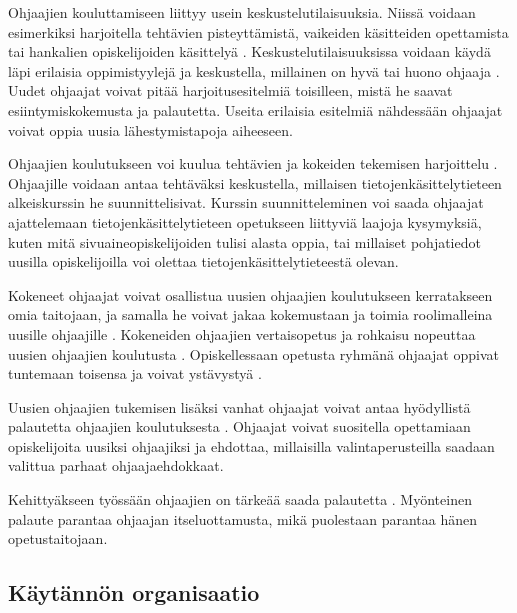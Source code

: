\documentclass[finnish]{tktltiki2}
\theoremstyle{definition}
\theoremstyle{remark}
\begin{document}
Ohjaajien kouluttamiseen liittyy usein keskustelutilaisuuksia. Niissä voidaan esimerkiksi harjoitella tehtävien pisteyttämistä, vaikeiden käsitteiden opettamista tai hankalien opiskelijoiden käsittelyä \cite{Reges03}. Kes\-kus\-te\-lu\-ti\-lai\-suuk\-sis\-sa voidaan käydä läpi erilaisia oppimistyylejä ja keskustella, millainen on hyvä tai huono ohjaaja \cite{Kay95}. Uudet ohjaajat voivat pitää harjoitusesitelmiä toisilleen, mistä he saavat esiintymiskokemusta ja palautetta. Useita erilaisia esitelmiä nähdessään ohjaajat voivat oppia uusia lähestymistapoja aiheeseen.  \par

Ohjaajien koulutukseen voi kuulua tehtävien ja kokeiden tekemisen harjoittelu \cite{Kay95}. Ohjaajille voidaan antaa tehtäväksi keskustella, millaisen tie\-to\-jen\-kä\-sit\-te\-ly\-tie\-teen alkeiskurssin he suunnittelisivat. Kurssin suunnitteleminen voi saada ohjaajat ajattelemaan tie\-to\-jen\-kä\-sit\-te\-ly\-tie\-teen opetukseen liittyviä laajoja kysymyksiä, kuten mitä sivuaineopiskelijoiden tulisi alasta oppia, tai millaiset pohjatiedot uusilla opiskelijoilla voi olettaa tietojenkäsittelytieteestä olevan.  \par

Kokeneet ohjaajat voivat osallistua uusien ohjaajien koulutukseen kerratakseen omia taitojaan, ja samalla he voivat jakaa kokemustaan ja toimia roolimalleina uusille ohjaajille \cite{Reges88}. Kokeneiden ohjaajien vertaisopetus ja rohkaisu nopeuttaa uusien ohjaajien koulutusta \cite{Decker06}. Opiskellessaan opetusta ryhmänä ohjaajat oppivat tuntemaan toisensa ja voivat ystävystyä \cite{Roberts95}. \par

Uusien ohjaajien tukemisen lisäksi vanhat ohjaajat voivat antaa hyödyllistä palautetta ohjaajien koulutuksesta \cite{Decker06}. Ohjaajat voivat suositella opettamiaan opiskelijoita uusiksi ohjaajiksi ja ehdottaa, millaisilla valintaperusteilla saadaan valittua parhaat ohjaajaehdokkaat.  \par

Kehittyäkseen työssään ohjaajien on tärkeää saada palautetta \cite{Patitsas12, Patitsas12_3}. Myönteinen palaute parantaa ohjaajan itseluottamusta, mikä puolestaan parantaa hänen opetustaitojaan. \par





\subsection{Käytännön organisaatio}
\end{document}
